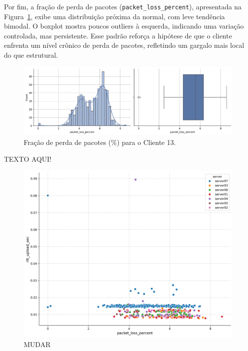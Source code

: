 \documentclass{article}
\begin{document}
Por fim, a fração de perda de pacotes (\texttt{packet\_loss\_percent}), apresentada na Figura~\ref{fig:chart_packet_loss_percent_client13}, exibe uma distribuição próxima da normal, com leve tendência bimodal.  
O boxplot mostra poucos outliers à esquerda, indicando uma variação controlada, mas persistente. Esse padrão reforça a hipótese de que o cliente enfrenta um nível crônico de perda de pacotes, refletindo um gargalo mais local do que estrutural.

\begin{figure}[htp]
	\includegraphics[width=\textwidth]{../figures/eda/chart_packet_loss_percent_client13.png}
	\caption{Fração de perda de pacotes (\%) para o Cliente 13.}
	\label{fig:chart_packet_loss_percent_client13}
\end{figure}

TEXTO AQUI!

\begin{figure}[htp]
	\includegraphics[width=\textwidth]{../figures/eda/scatter_client13.png}
	\caption{MUDAR}
	\label{fig:scatter_client13}
\end{figure}
\end{document}
